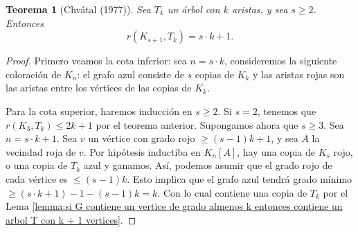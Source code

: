 \documentclass[12pt]{report}
\theoremstyle{plain}
\newtheorem{theorem}{Teorema}[section]
\theoremstyle{definition}
\begin{document}
\begin{theorem}[Chvátal (1977)]
Sea $T_k$ un árbol con $k$ aristas, y sea $s \geq 2$. Entonces
\[
    r(K_{s+1}, T_k) = s \cdot k  + 1.
\]
\end{theorem}
\begin{proof}
Primero veamos la cota inferior: sea $n = s\cdot k$, consideremos la siguiente coloración de $K_n$: el grafo azul consiste de $s$ copias de $K_k$ y las aristas rojas son las aristas entre los vértices de las copias de $K_k$.


Para la cota superior, haremos inducción en $s \geq 2$. Si $s = 2$, tenemos que $r (K_3, T_k) \leq 2 k + 1$ por el teorema anterior. Supongamos ahora que $s \geq 3$. Sea $n = s\cdot k + 1$. Sea $v$ un vértice con grado rojo $\geq (s-1)k + 1$, y sea $A$ la vecindad roja de $v$. Por hipótesis inductiba en $K_n[A]$, hay una copia de $K_s$ rojo, o una copia de $T_k$ azul y ganamos. Así, podemos asumir que el grado rojo de cada vértice es $\leq (s-1)k$. Esto implica que el grafo azul tendrá grado mínimo $\geq (s \cdot k +1 ) - 1 - (s - 1) k = k$. Con lo cual contiene una copia de $T_k$ por el Lema \ref{lemma:si G contiene un vertice de grado almenos k entonces contiene un arbol T con k + 1 vertices}.
\end{proof}
\end{document}
